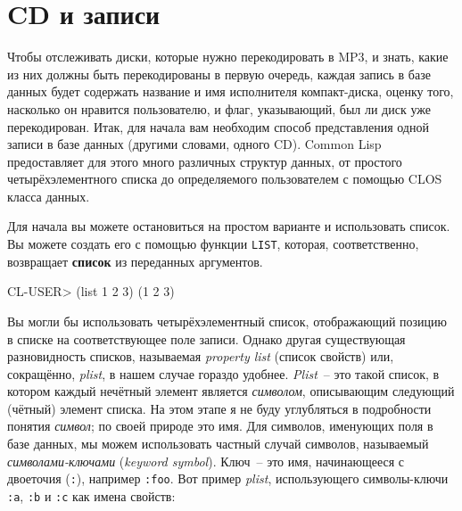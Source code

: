 \section{CD и записи}

Чтобы отслеживать диски, которые нужно перекодировать в MP3, и знать, какие из них должны
быть перекодированы в первую очередь, каждая запись в базе данных будет содержать название
и имя исполнителя компакт-диска, оценку того, насколько он нравится пользователю, и флаг,
указывающий, был ли диск уже перекодирован. Итак, для начала вам необходим способ
представления одной записи в базе данных (другими словами, одного CD). Common Lisp
предоставляет для этого много различных структур данных, от простого четырёхэлементного
списка до определяемого пользователем с помощью CLOS класса данных.

Для начала вы можете остановиться на простом варианте и использовать список. Вы можете
создать его с помощью функции \lstinline{LIST}, которая, соответственно, возвращает
\textbf{список} из
переданных аргументов.

\begin{myverb}
CL-USER> (list 1 2 3)
 (1 2 3)
\end{myverb}

Вы могли бы использовать четырёхэлементный список, отображающий позицию в списке на
соответствующее поле записи. Однако другая существующая разновидность списков, называемая
\textit{property list} (список свойств) или, сокращённо, \textit{plist}, в нашем случае
гораздо удобнее. \textit{Plist}~-- это такой список, в котором каждый нечётный элемент
является \textit{символом}, описывающим следующий (чётный) элемент списка. На этом этапе я
не буду углубляться в подробности понятия \textit{символ}; по своей природе это имя. Для
символов, именующих поля в базе данных, мы можем использовать частный случай символов,
называемый \textit{символами-ключами} (\textit{keyword symbol}). Ключ~-- это имя,
начинающееся с двоеточия (\lstinline{:}), например \lstinline{:foo}. Вот пример \textit{plist}, использующего символы-ключи \lstinline{:a},
\lstinline{:b} и \lstinline{:c} как имена свойств:

